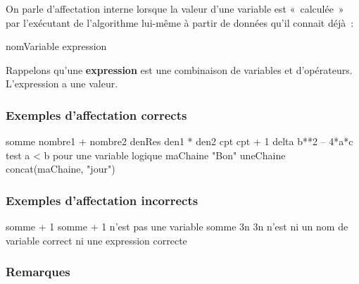 			On parle d’affectation interne lorsque la valeur d’une variable est
			«~calculée~» par l’exécutant de l’algorithme lui-même à partir de
			données qu’il connait déjà~:

			\begin{Pseudocode}
			\Let nomVariable \Gets expression
			\end{Pseudocode}
			
			Rappelons qu’une \textbf{expression} 
			est une combinaison de variables et
			d’opérateurs. L’expression a une valeur.
			
			\subsubsection*{Exemples d’affectation corrects}
			
			\begin{Pseudocode}
			\Let somme \Gets nombre1 + nombre2
			\Let denRes \Gets den1 * den2
			\Let cpt \Gets cpt + 1
			\Let delta \Gets b**2 – 4*a*c
			\Let test \Gets a < b \RComment pour une variable logique
			\Let maChaine \Gets "Bon"
			\Let uneChaine \Gets concat(maChaine, "jour")
			\end{Pseudocode}
			
			\subsubsection*{Exemples d’affectation incorrects}
			
			\begin{Pseudocode}
			\Let somme + 1 \Gets 3
			\RComment somme + 1 n’est pas une variable
			\Let somme \Gets 3n
			\RComment 3n n’est ni un nom de variable correct ni une expression correcte
			\end{Pseudocode}
			
			\subsubsection*{Remarques}

